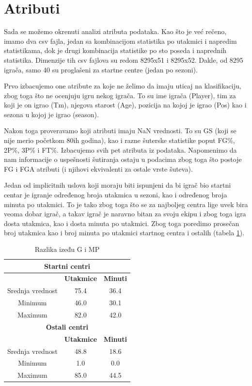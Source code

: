 \documentclass[a4paper]{article}
\begin{document}
\section{Atributi}
\label{sec:atributi}

Sada se možemo okrenuti analizi atributa podataka. Kao što je već rečeno,
imamo dva csv fajla, jedan sa kombinacijom statistika po utakmici i napredim
statistikama, dok je drugi kombinacija statistike po sto poseda i naprednih statistika. Dimenzije tih csv fajlova su redom 8295x51 i 8295x52. Dakle, od 8295
igrača, samo 40 su proglašeni za startne centre (jedan po sezoni).

Prvo izbacujemo one atribute za koje ne želimo da imaju uticaj na klasifikaciju, zbog toga što ne ocenjuju igru nekog igrača. To su ime igrača (Player), tim za koji je on igrao (Tm), njegova starost (Age), pozicija na kojoj je igrao (Pos) kao i sezona u kojoj je igrao (season). 

Nakon toga proveravamo koji atributi imaju NaN vrednosti. To su GS (koji se nije
merio početkom 80ih godina), kao i razne šuterske statistike poput FG\%, 2P\%,
3P\% i FT\%. Izbacujemo svih pet atributa iz podataka. Napomenimo da nam informacije o uspešnosti šutiranja ostaju u podacima zbog toga što postoje FG i FGA atributi (i njihovi ekvivalenti za ostale vrste šuteva).

Jedan od implicitnih uslova koji moraju biti ispunjeni da bi igrač bio startni
centar je igranje određenog broja utakmica u sezoni, kao i određenog broja
minuta po utakmici. To je tako zbog toga što se za najboljeg centra lige uvek
bira veoma dobar igrač, a takav igrač je naravno bitan za svoju ekipu i zbog toga igra dosta utakmica, kao i dosta minuta po utakmici. Zbog toga poredimo prosečan broj utakmica kao i broj minuta po utakmici startnog centra i ostalih (tabela \ref{tab:g_mp}).

\begin{table}[!h]
\begin{center}
\begin{tabular}{|c|c|c|} \hline
\multicolumn{3}{|c|}{\textbf{Startni centri}} \\ \hline
\textbf{} & \textbf{Utakmice} & \textbf{Minuti} \\ \hline
Srednja vrednost & 75.4 & 36.4 \\ \hline
Minimum          & 46.0 & 30.1 \\ \hline
Maximum          & 82.0 & 42.0 \\ \hline
\multicolumn{3}{|c|}{\textbf{Ostali centri}} \\ \hline
\textbf{} & \textbf{Utakmice} & \textbf{Minuti} \\ \hline
Srednja vrednost & 48.8 & 18.6 \\ \hline
Minimum          & 1.0  & 0.0  \\ \hline
Maximum          & 85.0 & 44.5 \\ \hline
\end{tabular}
\caption{Razlika izeđu G i MP}
\label{tab:g_mp}
\end{center}
\end{table}
\end{document}
